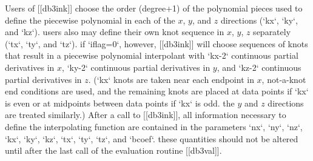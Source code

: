 Users of [[db3ink]] choose the order (degree+1) of the polynomial
pieces used to define the piecewise polynomial in each of the \(x\), \(y\),
and \(z\) directions (`kx`, `ky`, and `kz`). users also may define their own
knot sequence in \(x\), \(y\), \(z\) separately (`tx`, `ty`, and `tz`). if `iflag=0`,
however, [[db3ink]] will choose sequences of knots that result in a
piecewise polynomial interpolant with `kx-2` continuous partial
derivatives in \(x\), `ky-2` continuous partial derivatives in \(y\), and `kz-2`
continuous partial derivatives in \(z\). (`kx` knots are taken near
each endpoint in \(x\), not-a-knot end conditions are used, and the
remaining knots are placed at data points if `kx` is even or at
midpoints between data points if `kx` is odd. the \(y\) and \(z\) directions
are treated similarly.)
After a call to [[db3ink]], all information necessary to define the
interpolating function are contained in the parameters `nx`, `ny`, `nz`,
`kx`, `ky`, `kz`, `tx`, `ty`, `tz`, and `bcoef`. these quantities should not be
altered until after the last call of the evaluation routine [[db3val]].


